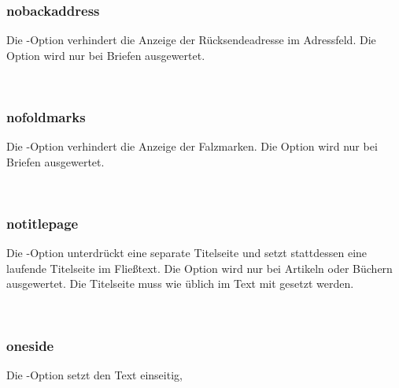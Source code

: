 \subsubsection{nobackaddress}

Die -Option verhindert die Anzeige der Rücksendeadresse im Adressfeld.
Die Option wird nur bei Briefen ausgewertet.

\begin{nutzung}
		\>\\
\end{nutzung}

\subsubsection{nofoldmarks}

Die -Option verhindert die Anzeige der Falzmarken.
Die Option wird nur bei Briefen ausgewertet.

\begin{nutzung}
		\>\\
\end{nutzung}

\subsubsection{notitlepage}

Die -Option unterdrückt eine separate Titelseite und setzt stattdessen eine laufende Titelseite im Fließtext.
Die Option wird nur bei Artikeln oder Büchern ausgewertet.
Die Titelseite muss wie üblich im Text mit  gesetzt werden.

\begin{nutzung}
		\>\\
\end{nutzung}

\subsubsection{oneside}

Die -Option setzt den Text einseitig,

\begin{nutzung}
		\>\\
\end{nutzung}

